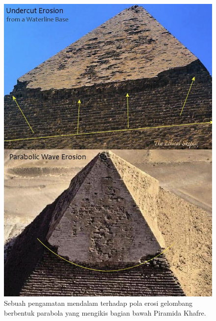 \documentclass[10pt,twocolumn,letterpaper]{article}
\begin{document}
\begin{figure}[H]
\begin{center}
   \includegraphics[width=1\linewidth]{wave.jpg}
\end{center}
   \caption{Sebuah pengamatan mendalam terhadap pola erosi gelombang berbentuk parabola yang mengikis bagian bawah Piramida Khafre\cite{27}.}
\label{fig:19}
\label{fig:onecol}
\end{figure}
\end{document}
